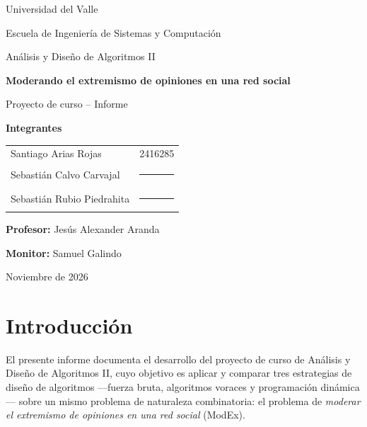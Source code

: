 \documentclass[11pt,letterpaper]{article}
\begin{document}
\begin{titlepage}
  \centering
  \vspace*{1cm}
  {\large Universidad del Valle\par}
  {\large Escuela de Ingeniería de Sistemas y Computación\par}
  \vspace{0.5cm}
  {\large Análisis y Diseño de Algoritmos II\par}
  \vspace{3cm}
  {\Huge\bfseries Moderando el extremismo de opiniones en una red social\par}
  \vspace{0.8cm}
  {\Large Proyecto de curso -- Informe\par}
  \vspace{3cm}
  {\large\textbf{Integrantes}\par}
  \vspace{0.3cm}
  \begin{tabular}{ll}
    Santiago Arias Rojas        & 2416285 \\
    Sebastián Calvo Carvajal    & \rule{2cm}{0.4pt} \\
    Sebastián Rubio Piedrahita  & \rule{2cm}{0.4pt} \\
  \end{tabular}
  \vfill
  {\large\textbf{Profesor:} Jesús Alexander Aranda\par}
  {\large\textbf{Monitor:} Samuel Galindo\par}
  \vspace{1cm}
  {\large Noviembre de 2026\par}
\end{titlepage}

\tableofcontents
\newpage
\listoftables
\listofalgorithms
\newpage

\section{Introducción}

El presente informe documenta el desarrollo del proyecto de curso de
Análisis y Diseño de Algoritmos II, cuyo objetivo es aplicar y comparar tres
estrategias de diseño de algoritmos ---fuerza bruta, algoritmos voraces y
programación dinámica--- sobre un mismo problema de naturaleza combinatoria:
el problema de \emph{moderar el extremismo de opiniones en una red social}
(ModEx).
\end{document}

